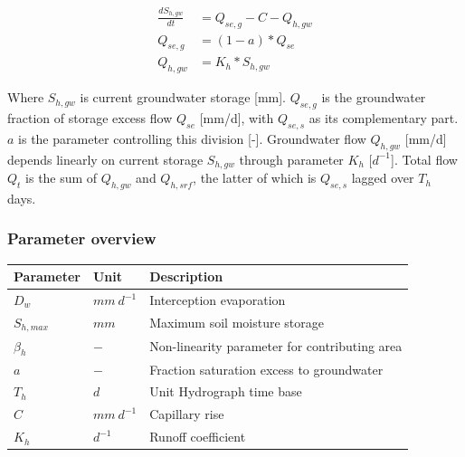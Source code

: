 \begin{align}
	\frac{dS_{h,gw}}{dt} &= Q_{se,g}-C-Q_{h,gw} \\
	Q_{se,g} &= (1-a)*Q_{se}\\
	Q_{h,gw} &= K_h*S_{h,gw}
\end{align}

Where $S_{h,gw}$ is current groundwater storage [mm]. $Q_{se,g}$ is the groundwater fraction of storage excess flow $Q_{se}$ [mm/d], with $Q_{se,s}$ as its complementary part. $a$ is the parameter controlling this division [-]. Groundwater flow $Q_{h,gw}$ [mm/d] depends linearly on current storage $S_{h,gw}$ through parameter $K_h$ [$d^{-1}$]. Total flow $Q_t$ is the sum of $Q_{h,gw}$ and $Q_{h,srf}$, the latter of which is $Q_{se,s}$ lagged over $T_h$ days.

\subsubsection{Parameter overview}
\begin{table}[htbp]
  \centering
    \begin{tabular}{lll}
    \toprule
    Parameter & Unit  & Description \\
    \midrule
    $D_w$ & $mm~d^{-1}$ & Interception evaporation  \\
    $S_{h,max}$ & $mm$  & Maximum soil moisture storage \\
    $\beta_h$ & $-$   & Non-linearity parameter for contributing area \\
    $a$   & $-$   & Fraction saturation excess to groundwater \\
    $T_h$ & $d$   & Unit Hydrograph time base \\
    $C$   & $mm~d^{-1}$ & Capillary rise \\
    $K_h$ & $d^{-1}$ & Runoff coefficient \\
    \bottomrule
    \end{tabular}%
  \label{tab:addlabel}%
\end{table}%

